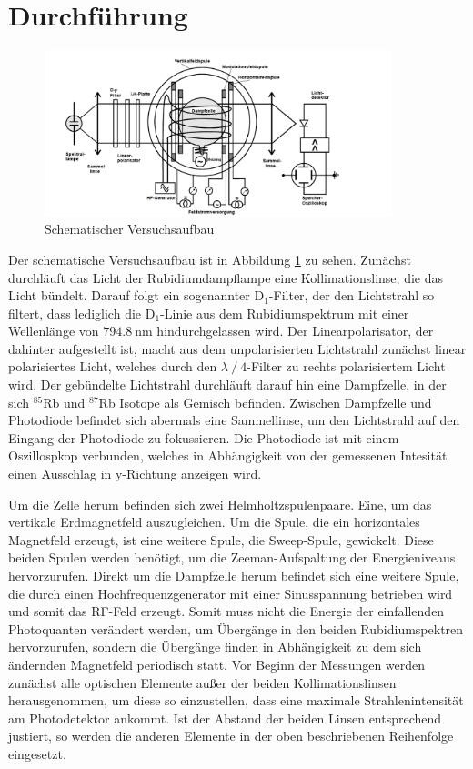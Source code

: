 \section{Durchführung}
\FloatBarrier
\begin{figure}
    \centering
    \includegraphics[width=0.9\textwidth]{Aufbau.PNG}
    \caption{Schematischer Versuchsaufbau}
    \label{abb:Aufbau}
\end{figure}
\FloatBarrier
Der schematische Versuchsaufbau ist in Abbildung \ref{abb:Aufbau} zu sehen.
Zunächst durchläuft das Licht der Rubidiumdampflampe eine Kollimationslinse, die das Licht bündelt. Darauf
folgt
ein sogenannter $\text{D}_1$-Filter, der den Lichtstrahl so filtert, dass
lediglich die $\text{D}_1$-Linie aus dem Rubidiumspektrum mit einer Wellenlänge von
$\SI{794,8}{\nano\meter}$ hindurchgelassen wird.
Der Linearpolarisator, der dahinter aufgestellt ist, macht aus dem unpolarisierten
Lichtstrahl zunächst linear polarisiertes Licht, welches durch den $\lambda\:/\:4$-Filter zu rechts polarisiertem Licht
wird.
Der gebündelte Lichtstrahl durchläuft darauf hin eine Dampfzelle, in der sich $^{85}$Rb
und $^{87}$Rb Isotope als Gemisch befinden. Zwischen Dampfzelle und Photodiode befindet
sich abermals eine Sammellinse, um den Lichtstrahl auf den Eingang der Photodiode zu fokussieren. Die Photodiode ist mit
einem Oszillospkop verbunden, welches in
Abhängigkeit von der gemessenen Intesität einen Ausschlag in y-Richtung anzeigen wird.

\noindent Um die Zelle herum befinden sich zwei Helmholtzspulenpaare. Eine, um das vertikale Erdmagnetfeld auszugleichen. Um die
Spule, die ein horizontales Magnetfeld
erzeugt, ist eine weitere Spule, die Sweep-Spule, gewickelt. Diese beiden Spulen werden
benötigt, um die Zeeman-Aufspaltung der Energieniveaus hervorzurufen.
Direkt um die Dampfzelle herum befindet sich eine weitere Spule, die durch einen
Hochfrequenzgenerator mit einer Sinusspannung betrieben wird und somit das RF-Feld
erzeugt. Somit muss nicht die
Energie der einfallenden Photoquanten verändert werden, um Übergänge in den beiden
Rubidiumspektren hervorzurufen, sondern die Übergänge finden in Abhängigkeit zu dem sich
ändernden Magnetfeld periodisch statt.
Vor Beginn der Messungen werden zunächst alle optischen Elemente außer der beiden
Kollimationslinsen herausgenommen, um diese so einzustellen, dass eine maximale
Strahlenintensität am Photodetektor ankommt. Ist der Abstand der beiden Linsen
entsprechend justiert, so werden die anderen Elemente in der oben beschriebenen
Reihenfolge eingesetzt.


